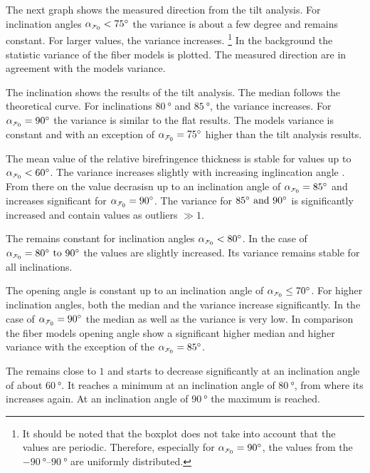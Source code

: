 % 
The next graph shows the measured direction from the tilt analysis.
For inclination angles $\modelInc<\SI{75}{\degree}$ the variance is about a few degree and remains constant.
For larger values, the variance increases.
\footnote{It should be noted that the boxplot does not take into account that the values are periodic.
Therefore, especially for $\modelInc=\SI{90}{\degree}$, the values from the $\SIrange{-90}{90}{\degree}$ are uniformly distributed.}
In the background the statistic \bvariance{} variance of the fiber models is plotted.
The measured direction are in agreement with the models variance.
\par
%
The inclination shows the results of the tilt analysis.
The median follows the theoretical curve.
For inclinations $\SI{80}{\degree}$ and $\SI{85}{\degree}$, the variance increases.
For $\modelInc = \SI{90}{\degree}$ the variance is similar to the flat results.
The models \bvariance{} variance is constant and with an exception of $\modelInc=\SI{75}{\degree}$ higher than the tilt analysis results.
\par
%
The mean value of the relative birefringence thickness \trel{} is stable for values up to $\modelInc < \SI{60}{\degree}$.
The variance increases slightly with increasing inglincation angle \modelInc{}.
From there on the \trel{} value decrasisn up to an inclination angle of $\modelInc=\SI{85}{\degree}$ and increases significant for $\modelInc = \SI{90}{\degree}$.
The variance for $\SIlist{85;90}{\degree}$ is significantly increased and contain values as outliers $\gg 1$.
\par
% 
The \rvalue{} remains constant for inclination angles $\modelInc < \SI{80}{\degree}$.
In the case of $\modelInc=\SIrange[]{80}{90}{\degree}$ the values are slightly increased.
Its variance remains stable for all inclinations.
\par
%
The opening angle \openingAngle{} is constant up to an inclination angle of $\modelInc \le \SI{70}{\degree}$.
For higher inclination angles, both the median and the variance increase significantly.
In the case of $\modelInc = \SI{90}{\degree}$ the median as well as the variance is very low.
In comparison the fiber models opening angle \openingAngle{} show a significant higher median and higher \bvariance{} variance with the exception of the $\modelInc=\SI{85}{\degree}$.
\par
% 
The \accvalue{} remains close to $1$ and starts to decrease significantly at an inclination angle of about $\SI{60}{\degree}$.
It reaches a minimum at an inclination angle of $\SI{80}{\degree}$, from where its increases again.
At an inclination angle of $\SI{90}{\degree}$ the maximum \accvalue{} is reached.
%
%
%
